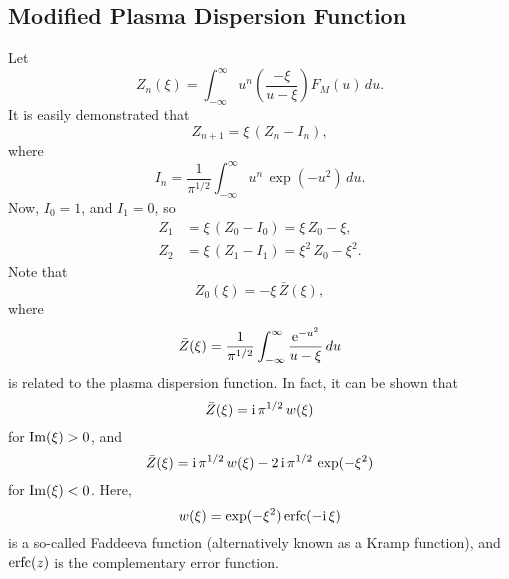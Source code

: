 \documentclass[12pt,prb,aps]{revtex4-1}
\begin{document}
\subsection{Modified Plasma Dispersion Function}
Let
\begin{equation}\label{e44}
Z_n(\xi)= \int_{-\infty}^\infty u^n\left(\frac{-\xi}{u-\xi}\right)F_M(u)\,du.
\end{equation}
It is easily demonstrated that 
\begin{equation}
Z_{n+1}= \xi\,(Z_n-I_{n}),
\end{equation}
where
\begin{equation}
I_n = \frac{1}{\pi^{1/2}}\int_{-\infty}^\infty u^n\,\exp(-u^2)\,du.
\end{equation}
Now, $I_0=1$, and $I_1=0$, so
\begin{align}\label{ez1}
Z_1 &= \xi\,(Z_0-I_0) = \xi\,Z_0-\xi,\\[0.5ex]
Z_2&= \xi\,(Z_1-I_1) =  \xi^2\,Z_0-\xi^2.\label{ez2}
\end{align}
Note that 
\begin{equation}
Z_0(\xi)= -\xi\,\bar{Z}(\xi),
\end{equation}
where
\begin{equation}
\bar{Z}(\xi) = \frac{1}{\pi^{1/2}}\int_{-\infty}^\infty \frac{{\rm e}^{-u^2}}{u-\xi}\,du
\end{equation}
is related to the plasma dispersion function.\cite{rf0,fc}
In fact, it can be shown that\,\cite{rf0}
\begin{equation}
\bar{Z}(\xi)= {\rm i}\,\pi^{1/2}\,w(\xi)
\end{equation}
for ${\rm Im}(\xi)>0$, and 
\begin{equation}
\bar{Z}(\xi)={\rm i}\,\pi^{1/2}\,w(\xi)-2\,{\rm i}\,\pi^{1/2}\,\exp(-\xi^2) 
\end{equation}
for ${\rm Im}(\xi)<0$.
Here,
\begin{equation}
w(\xi)= \exp(-\xi^2)\,{\rm erfc}(-{\rm i}\,\xi)
\end{equation}
is a so-called Faddeeva function (alternatively known as a Kramp function),\cite{as} and 
${\rm erfc}(z)$ is the complementary error function.\cite{as} 
\end{document}
